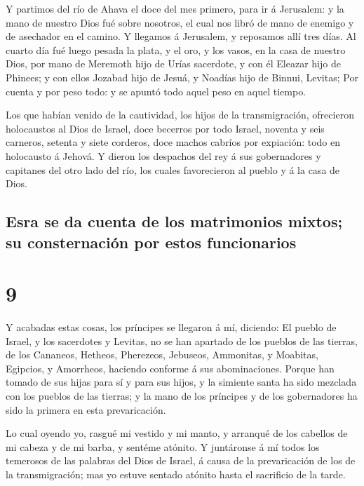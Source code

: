  Y partimos del río de Ahava el doce del mes primero,
para ir á Jerusalem: y la mano de nuestro Dios fué sobre nosotros, el
cual nos libró de mano de enemigo y de asechador en el camino.
 Y llegamos á Jerusalem, y reposamos allí tres días.
 Al cuarto día fué luego pesada la plata, y el oro, y los
vasos, en la casa de nuestro Dios, por mano de Meremoth hijo de Urías
sacerdote, y con él Eleazar hijo de Phinees; y con ellos Jozabad hijo de
Jesuá, y Noadías hijo de Binnui, Levitas;  Por cuenta y
por peso todo: y se apuntó todo aquel peso en aquel tiempo.

 Los que habían venido de la cautividad, los hijos de la
transmigración, ofrecieron holocaustos al Dios de Israel, doce becerros
por todo Israel, noventa y seis carneros, setenta y siete corderos, doce
machos cabríos por expiación: todo en holocausto á Jehová.
 Y dieron los despachos del rey á sus gobernadores y
capitanes del otro lado del río, los cuales favorecieron al pueblo y á
la casa de Dios.

\hypertarget{esra-se-da-cuenta-de-los-matrimonios-mixtos-su-consternaciuxf3n-por-estos-funcionarios}{%
\subsection{Esra se da cuenta de los matrimonios mixtos; su
consternación por estos
funcionarios}\label{esra-se-da-cuenta-de-los-matrimonios-mixtos-su-consternaciuxf3n-por-estos-funcionarios}}

\hypertarget{section-8}{%
\section{9}\label{section-8}}

 Y acabadas estas cosas, los príncipes se llegaron á mí,
diciendo: El pueblo de Israel, y los sacerdotes y Levitas, no se han
apartado de los pueblos de las tierras, de los Cananeos, Hetheos,
Pherezeos, Jebuseos, Ammonitas, y Moabitas, Egipcios, y Amorrheos,
haciendo conforme á sus abominaciones.  Porque han tomado
de sus hijas para sí y para sus hijos, y la simiente santa ha sido
mezclada con los pueblos de las tierras; y la mano de los príncipes y de
los gobernadores ha sido la primera en esta prevaricación.

 Lo cual oyendo yo, rasgué mi vestido y mi manto, y
arranqué de los cabellos de mi cabeza y de mi barba, y sentéme atónito.
 Y juntáronse á mí todos los temerosos de las palabras del
Dios de Israel, á causa de la prevaricación de los de la transmigración;
mas yo estuve sentado atónito hasta el sacrificio de la tarde.

